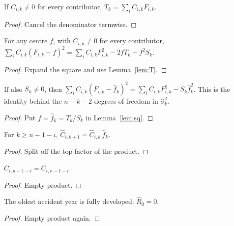 \begin{lemma}\label{lem:T}\leanok
{}
If $C_{i,k} \neq 0$ for every contributor, $T_k = \sum_i C_{i,k} F_{i,k}$.
\end{lemma}
\begin{proof}\leanok Cancel the denominator termwise. \end{proof}

\begin{lemma}\label{lem:sq}\leanok
{}
For any centre $f$, with $C_{i,k} \neq 0$ for every contributor,
$\sum_i C_{i,k}(F_{i,k}-f)^2 = \sum_i C_{i,k}F_{i,k}^2 - 2 f T_k + f^2 S_k$.
\end{lemma}
\begin{proof}\leanok Expand the square and use Lemma~\ref{lem:T}. \end{proof}

\begin{lemma}\label{lem:sq_fhat}\leanok
{}
If also $S_k \neq 0$, then
$\sum_i C_{i,k}(F_{i,k}-\hat f_k)^2 = \sum_i C_{i,k}F_{i,k}^2 - S_k \hat f_k^2$.
This is the identity behind the $n-k-2$ degrees of freedom in $\hat\sigma_k^2$.
\end{lemma}
\begin{proof}\leanok Put $f = \hat f_k = T_k/S_k$ in Lemma~\ref{lem:sq}. \end{proof}

\begin{lemma}\label{lem:Chat_succ}\leanok
{}
For $k \ge n-1-i$, $\hat C_{i,k+1} = \hat C_{i,k}\,\hat f_k$.
\end{lemma}
\begin{proof}\leanok Split off the top factor of the product. \end{proof}

\begin{lemma}\label{lem:Chat_diag}\leanok
{}
$\hat C_{i,n-1-i} = C_{i,n-1-i}$.
\end{lemma}
\begin{proof}\leanok Empty product. \end{proof}

\begin{lemma}\label{lem:oldest}\leanok
{}
The oldest accident year is fully developed: $\hat R_0 = 0$.
\end{lemma}
\begin{proof}\leanok Empty product again. \end{proof}

